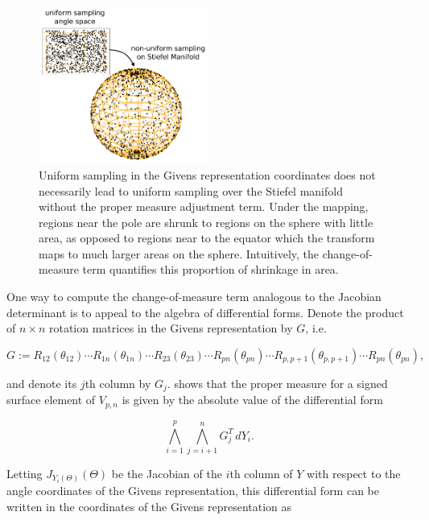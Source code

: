 \documentclass[ba]{imsart}
\numberwithin{equation}{section}
\theoremstyle{plain}
\begin{document}
\begin{figure}[h]
\centering
\vspace{.1in}
\includegraphics[width=0.5\textwidth]{figures/AreaForm_atz.pdf}
\vspace{.05in}
\caption{Uniform sampling in the Givens representation coordinates does not necessarily lead to uniform sampling over the Stiefel manifold without the proper measure adjustment term. Under the mapping, regions near the pole are shrunk to regions on the sphere with little area, as opposed to regions near to the equator which the transform maps to much larger areas on the sphere. Intuitively, the change-of-measure term quantifies this proportion of shrinkage in area.}
\label{fig:AreaForm}
\end{figure}


\noindent One way to compute the change-of-measure term analogous to the Jacobian determinant is to appeal to the algebra of differential forms. Denote the product of $n \times n$ rotation matrices in the Givens representation by $G$, i.e. 

\begin{equation}
G := R_{12}(\theta_{12}) \cdots R_{1n}(\theta_{1n})  \cdots R_{23}(\theta_{23}) \cdots R_{pn}(\theta_{pn}) \cdots R_{p,p+1}(\theta_{p,p+1}) \cdots R_{pn}(\theta_{pn}),
\end{equation}

\noindent and denote its $j$th column by $G_j$. \cite{muirhead2009aspects} shows that the proper measure for a signed surface element of $V_{p,n}$ is given by the absolute value of the differential form

\begin{equation}
\label{eq:WedgeForm}
\bigwedge_{i=1}^p \bigwedge_{j=i+1}^n G_j^T\, dY_i.
\end{equation}

\noindent Letting $J_{Y_i(\Theta)}(\Theta)$ be the Jacobian of the $i$th column of $Y$ with respect to the angle coordinates of the Givens representation, this differential form can be written in the coordinates of the Givens representation as
\end{document}
